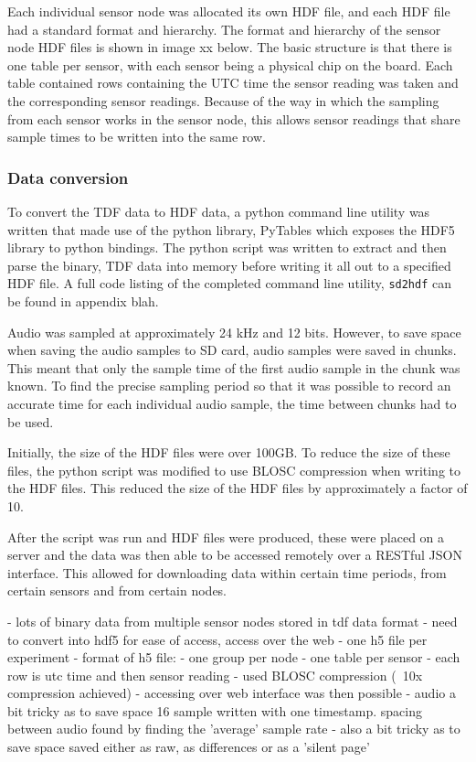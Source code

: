 Each individual sensor node was allocated its own HDF file, and each HDF file had a standard format and hierarchy. The format and hierarchy of the sensor node HDF files is shown in image xx below. The basic structure is that there is one table per sensor, with each sensor being a physical chip on the board. Each table contained rows containing the UTC time the sensor reading was taken and the corresponding sensor readings. Because of the way in which the sampling from each sensor works in the sensor node, this allows sensor readings that share sample times to be written into the same row.  

\subsubsection{Data conversion}
To convert the TDF data to HDF data, a python command line utility was written that made use of the python library, PyTables which exposes the HDF5 library to python bindings. The python script was written to extract and then parse the binary, TDF data into memory before writing it all out to a specified HDF file. A full code listing of the completed command line utility, \texttt{sd2hdf} can be found in appendix blah. 

Audio was sampled at approximately 24 kHz and 12 bits. However, to save space when saving the audio samples to SD card, audio samples were saved in chunks. This meant that only the sample time of the first audio sample in the chunk was known. To find the precise sampling period so that it was possible to record an accurate time for each individual audio sample, the time between chunks had to be used.  

Initially, the size of the HDF files were over 100GB. To reduce the size of these files, the python script was modified to use BLOSC compression when writing to the HDF files. This reduced the size of the HDF files by approximately a factor of 10. 

After the script was run and HDF files were produced, these were placed on a server and the data was then able to be accessed remotely over a RESTful JSON interface. This allowed for downloading data within certain time periods, from certain sensors and from certain nodes. 

- lots of binary data from multiple sensor nodes stored in tdf data format
- need to convert into hdf5 for ease of access, access over the web
	- one h5 file per experiment
	- format of h5 file:
		- one group per node	
		- one table per sensor	
		- each row is utc time and then sensor reading
- used BLOSC compression (~10x compression achieved)
- accessing over web interface was then possible 
- audio a bit tricky as to save space 16 sample written with one timestamp. spacing between audio found by finding the 'average' sample rate 
	- also a bit tricky as to save space saved either as raw, as differences or as a 'silent page'

